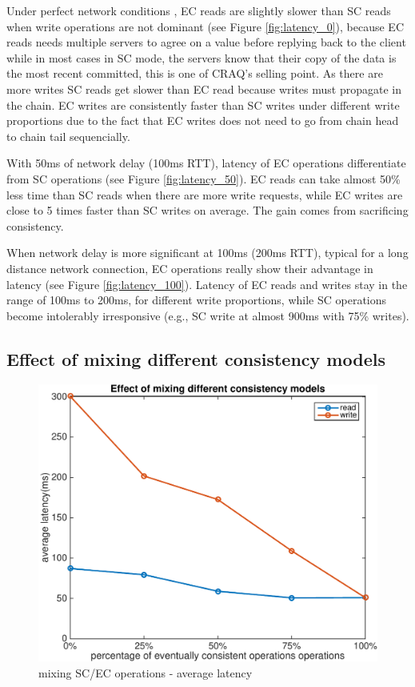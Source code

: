 Under perfect network conditions , EC reads are slightly slower than SC reads when write operations are not dominant (see Figure \ref{fig:latency_0}), because EC reads needs multiple servers to agree on a value before replying back to the client while in most cases in SC mode, the servers know that their copy of the data is the most recent committed, this is one of CRAQ's selling point. As there are more writes SC reads get slower than EC read because writes must propagate in the chain. EC writes are consistently faster than SC writes under different write proportions due to the fact that EC writes does not need to go from chain head to chain tail sequencially.

With 50ms of network delay (100ms RTT), latency of EC operations differentiate from SC operations  (see Figure \ref{fig:latency_50}). EC reads can take almost 50\% less time than SC reads when there are more write requests, while EC writes are close to 5 times faster than SC writes on average. The gain comes from sacrificing consistency.

When network delay is more significant at 100ms (200ms RTT), typical for a long distance network connection, EC operations really show their advantage in latency  (see Figure \ref{fig:latency_100}). Latency of EC reads and writes stay in the range of 100ms to 200ms, for different write proportions, while SC operations become intolerably irresponsive (e.g., SC write at almost 900ms with 75\% writes).

\subsection{Effect of mixing different consistency models}
\vspace{-2mm}
\begin{figure}[h]
\centering
\includegraphics[width=0.95\linewidth]{figures/mix.pdf}
\caption{mixing SC/EC operations - average latency}
\label{fig:mix}
\end{figure}
\vspace{-5mm}

